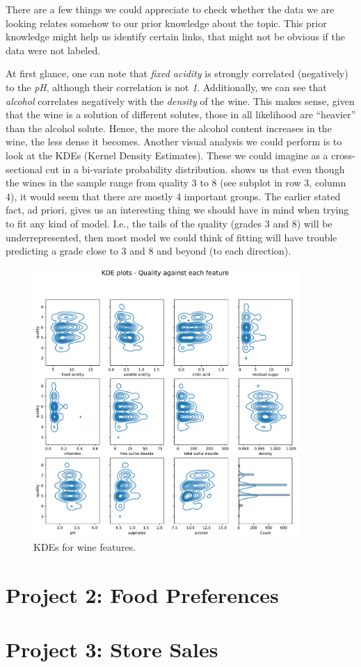 \documentclass[11pt]{article}
\begin{document}
There are a few things we could appreciate to check whether the data we are looking relates somehow
to our prior knowledge about the topic.
This prior knowledge might help us identify certain links, that might not be obvious if the data were not labeled.

At first glance, one can note that \emph{fixed acidity} is strongly correlated (negatively) to the \emph{pH},
although their correlation is not \emph{1}.
Additionally, we can see that \emph{alcohol} correlates negatively with the \emph{density} of the wine.
This makes sense, given that the wine is a solution of different solutes, those in all likelihood are ``heavier''
than the alcohol solute.
Hence, the more the alcohol content increases in the wine, the less dense it becomes.
\vspace{2pt}
Another visual analysis we could perform is to look at the KDEs (Kernel Density Estimates).
These we could imagine as a cross-sectional cut in a bi-variate probability distribution.
 shows us that even though the wines in the sample range from quality 3 to 8
(see subplot in row 3, column 4), it would seem that there are mostly 4 important groups.
The earlier stated fact, ad priori, gives us an interesting thing we should have in mind when trying
to fit any kind of model.
I.e., the tails of the quality (grades 3 and 8) will be underrepresented, then most model we could think
of fitting will have trouble predicting a grade close to 3 and 8 and beyond (to each direction).

\begin{figure}[h!]
    \includegraphics[width=0.9\textwidth]{figs/wine_kde}
    \caption{KDEs for wine features.}
    \label{fig:wine_kdes}
\end{figure}

\newpage
\part[food]{Project 2: Food Preferences}


\newpage
\part[stores]{Project 3: Store Sales}
\end{document}
